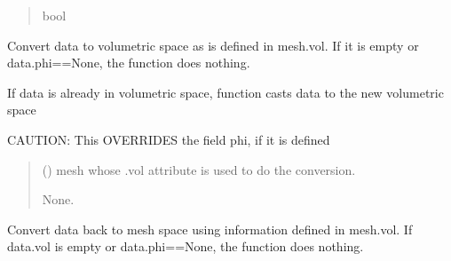 \documentclass[letterpaper,10pt,english]{sphinxmanual}
\begin{document}
\begin{fulllineitems}
\begin{fulllineitems}
\begin{quote}
\begin{description}
\sphinxAtStartPar
bool

\end{description}\end{quote}

\end{fulllineitems}


\begin{fulllineitems}
\label{\detokenize{_autosummary/nirfasterff.base.data.TPSFdata:nirfasterff.base.data.TPSFdata.togrid}}
\pysigstartsignatures
\pysiglinewithargsret
{}
{}
{}
\pysigstopsignatures
\sphinxAtStartPar
Convert data to volumetric space as is defined in mesh.vol. If it is empty or data.phi==None, the function does nothing.

\sphinxAtStartPar
If data is already in volumetric space, function casts data to the new volumetric space

\sphinxAtStartPar
CAUTION: This OVERRIDES the field phi, if it is defined
\begin{quote}\begin{description}
\sphinxAtStartPar
{} () \textendash{} mesh whose .vol attribute is used to do the conversion.

\sphinxAtStartPar
None.

\end{description}\end{quote}

\end{fulllineitems}


\begin{fulllineitems}
\label{\detokenize{_autosummary/nirfasterff.base.data.TPSFdata:nirfasterff.base.data.TPSFdata.tomesh}}
\pysigstartsignatures
\pysiglinewithargsret
{}
{}
{}
\pysigstopsignatures
\sphinxAtStartPar
Convert data back to mesh space using information defined in mesh.vol. If data.vol is empty or data.phi==None, the function does nothing.


\end{fulllineitems}
\end{fulllineitems}
\end{document}
